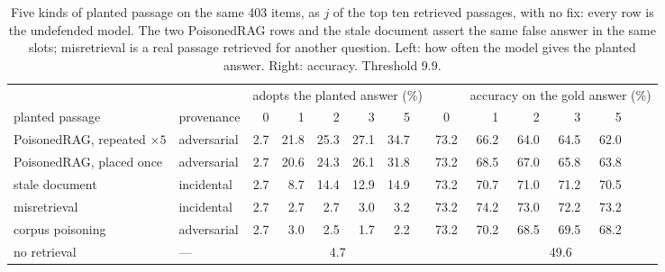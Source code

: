 \begin{table}[t]
\centering
\caption{Five kinds of planted passage on the same 403 items, as $j$ of the top ten retrieved passages, with no fix: every row is the undefended model. The two PoisonedRAG rows and the stale document assert the same false answer in the same slots; misretrieval is a real passage retrieved for another question. Left: how often the model gives the planted answer. Right: accuracy. Threshold 9.9\pp{}.}
\label{tab:regime}
\footnotesize
\begin{tabular}{@{}llrrrrrrcrrrrrr@{}}
\toprule
& & \multicolumn{6}{c}{adopts the planted answer (\%)} & & \multicolumn{6}{c}{accuracy on the gold answer (\%)} \\
\cmidrule(lr){3-8}\cmidrule(lr){10-15}
planted passage & provenance & 0 & 1 & 2 & 3 & 5 & & 0 & 1 & 2 & 3 & 5 \\
\midrule
PoisonedRAG, repeated $\times 5$ & adversarial & 2.7 & 21.8 & 25.3 & 27.1 & 34.7 & & 73.2 & 66.2 & 64.0 & 64.5 & 62.0 \\
PoisonedRAG, placed once & adversarial & 2.7 & 20.6 & 24.3 & 26.1 & 31.8 & & 73.2 & 68.5 & 67.0 & 65.8 & 63.8 \\
stale document & incidental & 2.7 & 8.7 & 14.4 & 12.9 & 14.9 & & 73.2 & 70.7 & 71.0 & 71.2 & 70.5 \\
misretrieval & incidental & 2.7 & 2.7 & 2.7 & 3.0 & 3.2 & & 73.2 & 74.2 & 73.0 & 72.2 & 73.2 \\
corpus poisoning & adversarial & 2.7 & 3.0 & 2.5 & 1.7 & 2.2 & & 73.2 & 70.2 & 68.5 & 69.5 & 68.2 \\
\midrule
no retrieval & --- & \multicolumn{6}{c}{4.7} & & \multicolumn{6}{c}{49.6} \\
\bottomrule
\end{tabular}
\end{table}
